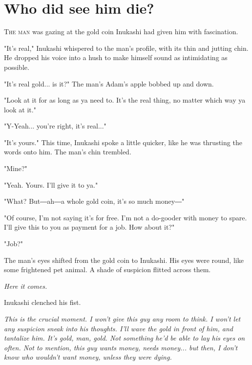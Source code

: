 
\chapter{Who did see him die?}


\lettrine{T}{he man} was gazing at the gold coin Inukashi had given him with
fascination.

"It's real," Inukashi whispered to the man's profile, with its thin and
jutting chin. He dropped his voice into a hush to make himself sound as
intimidating as possible.

"It's real gold... is it?" The man's Adam's apple bobbed up and down.

"Look at it for as long as ya need to. It's the real thing, no matter
which way ya look at it."

"Y-Yeah... you're right, it's real..."

"It's yours." This time, Inukashi spoke a little quicker, like he was
thrusting the words onto him. The man's chin trembled.

"Mine?"

"Yeah. Yours. I'll give it to ya."

"What? But―ah―a whole gold coin, it's so much money―"

"Of course, I'm not saying it's for free. I'm not a do-gooder with money
to spare. I'll give this to you as payment for a job. How about it?"

"Job?"

The man's eyes shifted from the gold coin to Inukashi. His eyes were
round, like some frightened pet animal. A shade of suspicion flitted
across them.

\emph{Here it comes.}

Inukashi clenched his fist.

\emph{This is the crucial moment. I won't give this guy any room to think. I
won't let any suspicion sneak into his thoughts. I'll wave the gold in
front of him, and tantalize him. It's gold, man, gold. Not something
he'd be able to lay his eyes on often. Not to mention, this guy wants
money, \emph{needs} money... but then, I don't know who \emph{wouldn't} want money,
unless they were dying.}

